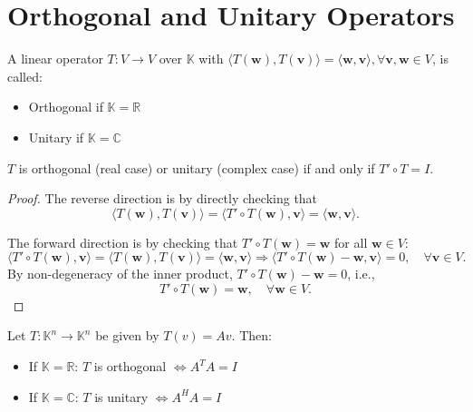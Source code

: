\section{Orthogonal and Unitary Operators}

\begin{definition}
A linear operator \(T : V \rightarrow V\) over \(\mathbb{K}\) with \(\langle T(\mathbf{w}),T(\mathbf{v}) \rangle = \langle \mathbf{w},\mathbf{v}\rangle, \forall \mathbf{v},\mathbf{w} \in V\), is called:
\begin{itemize}
  \item Orthogonal if \(\mathbb{K} = \mathbb{R}\)
  \item Unitary if \(\mathbb{K} = \mathbb{C}\)
\end{itemize}
\end{definition}

\begin{proposition}\label{prop:orthogonal-unitary}
\( T \) is orthogonal (real case) or unitary (complex case) if and only if \( T' \circ T = I \).
\end{proposition}

\begin{proof}
The reverse direction is by directly checking that
\[
\langle T(\mathbf{w}), T(\mathbf{v}) \rangle 
= \langle T' \circ T(\mathbf{w}), \mathbf{v} \rangle 
= \langle \mathbf{w}, \mathbf{v} \rangle.
\]

The forward direction is by checking that \( T' \circ T(\mathbf{w}) = \mathbf{w} \) for all \( \mathbf{w} \in V \):
\[
\langle T' \circ T(\mathbf{w}), \mathbf{v} \rangle 
= \langle T(\mathbf{w}), T(\mathbf{v}) \rangle 
= \langle \mathbf{w}, \mathbf{v} \rangle 
\Rightarrow 
\langle T' \circ T(\mathbf{w}) - \mathbf{w}, \mathbf{v} \rangle = 0, \quad \forall \mathbf{v} \in V.
\]
By non-degeneracy of the inner product, \( T' \circ T(\mathbf{w}) - \mathbf{w} = 0 \), i.e.,
\[
T' \circ T(\mathbf{w}) = \mathbf{w}, \quad \forall \mathbf{w} \in V.
\]
\end{proof}

\begin{example}
Let \(T : \mathbb{K}^n \rightarrow \mathbb{K}^n\) be given by \(T(v) = Av\). Then:
\begin{itemize}
  \item If \(\mathbb{K} = \mathbb{R}\): \(T\) is orthogonal \(\Leftrightarrow A^T A = I\)
  \item If \(\mathbb{K} = \mathbb{C}\): \(T\) is unitary \(\Leftrightarrow A^H A = I\)
\end{itemize}
\end{example}

